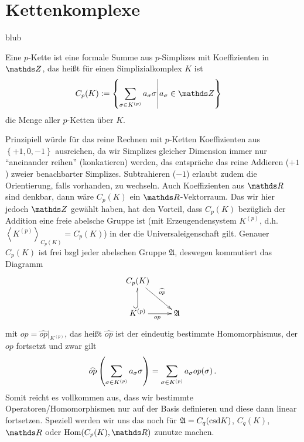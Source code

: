 \section{Kettenkomplexe}

  \begin{ziel}
    blub  
  \end{ziel}

  \begin{definition}
    Eine \( p \)-Kette ist eine formale Summe aus \( p \)-Simplizes mit Koeffizienten in \( \Z \),
    das heißt für einen Simplizialkomplex \( K \) ist
    \begin{align}
      \label{eqKette}
      C_{p}(K) &:= \left\{\sum_{\sigma\in K^{(p)}}a_{\sigma}\sigma \middle| a_{\sigma}\in\Z \right\}
    \end{align}
    die Menge aller \( p \)-Ketten über \( K \).
  \end{definition}
  Prinzipiell würde für das reine Rechnen mit \( p \)-Ketten Koeffizienten aus \( \left\{ +1, 0,  -1 \right\} \) ausreichen,
  da wir Simplizes gleicher Dimension immer nur "`aneinander reihen"' (konkatieren) werden, das entspräche das reine Addieren (\( +1 \)) zweier benachbarter Simplizes.
  Subtrahieren (\( -1 \)) erlaubt zudem die Orientierung, falls vorhanden, zu wechseln.
  Auch Koeffizienten aus \( \R \) sind denkbar, dann wäre \( C_{p}(K) \) ein \( \R \)-Vektorraum.
  Das wir hier jedoch \( \Z \) gewählt haben, hat den Vorteil, dass \( C_{p}(K) \) bezüglich der Addition eine freie abelsche Gruppe ist
  (mit Erzeugendensystem \( K^{(p)} \), d.h.  \( \left\langle K^{(p)} \right\rangle_{C_{p}(K)} = C_{p}(K) \))
  in der die Universaleigenschaft gilt.
  Genauer \( C_{p}(K) \) ist frei bzgl jeder abelschen Gruppe \( \mathfrak{A} \), deswegen kommutiert das Diagramm
  \begin{align}
    \label{diagFreieAbelscheGruppe}
    \begin{xy}
      \xymatrix{
        C_{p}(K) \ar[rd]^{\widehat{op}} & \\
        K^{(p)} \ar@^{(->}[u] \ar[r]_{op}& \mathfrak{A}
      }
    \end{xy}
  \end{align}
  mit \( op = \widehat{op}|_{K^{(p)}} \), das heißt \( \widehat{op} \) ist der eindeutig bestimmte Homomorphismus, der \( op \) fortsetzt und zwar gilt
  \begin{align}
    \widehat{op}\left(\sum_{\sigma\in K^{(p)}}a_{\sigma}\sigma\right) = \sum_{\sigma\in K^{(p)}}a_{\sigma}op(\sigma) \,\text{.}
  \end{align}
  Somit reicht es vollkommen aus, dass wir bestimmte Operatoren/Homomorphismen nur auf der Basis definieren und diese dann linear fortsetzen.
  Speziell werden wir uns das noch für \( \mathfrak{A} = C_{q}(\text{csd} K) \), \( C_{q}(K) \), \( \R \) oder \( \hom(C_{p}(K),\R) \) zunutze machen. 


